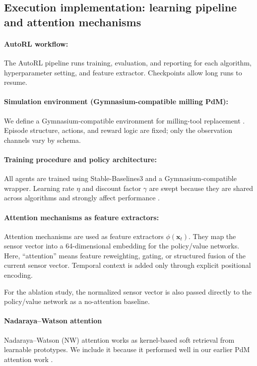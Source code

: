 \documentclass[sn-basic]{sn-jnl}%
\begin{document}
\subsection{Execution implementation: learning pipeline and attention mechanisms}\label{sec:algo_desc}
\paragraph{AutoRL workflow:}\label{sec:autorl}
The AutoRL pipeline runs training, evaluation, and reporting for each algorithm, hyperparameter setting, and feature extractor. Checkpoints allow long runs to resume.

\paragraph{Simulation environment (Gymnasium-compatible milling PdM):}
We define a Gymnasium-compatible environment for milling-tool replacement \cite{Foundation2023}. Episode structure, actions, and reward logic are fixed; only the observation channels vary by schema.

\paragraph{Training procedure and policy architecture:}
All agents are trained using Stable-Baselines3 and a Gymnasium-compatible wrapper. Learning rate $\eta$ and discount factor $\gamma$ are swept because they are shared across algorithms and strongly affect performance \cite{Henderson2019, Shala2022AutoRL, Eimer2023}.
  
\paragraph{Attention mechanisms as feature extractors:}
\label{sec:attention}

Attention mechanisms are used as feature extractors $\phi(\mathbf{x}_t)$. They map the sensor vector into a 64-dimensional embedding for the policy/value networks. Here, ``attention'' means feature reweighting, gating, or structured fusion of the current sensor vector. Temporal context is added only through explicit positional encoding.

For the ablation study, the normalized sensor vector is also passed directly to the policy/value network as a no-attention baseline.

\paragraph{Nadaraya--Watson attention}
Nadaraya--Watson (NW) attention works as kernel-based soft retrieval from learnable prototypes. We include it because it performed well in our earlier PdM attention work \cite{Siraskar2024}.
\end{document}
